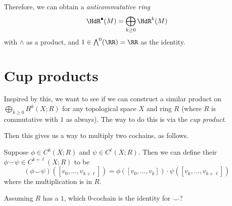 Therefore, we can obtain a \emph{anticommutative ring}
\[ \HdR^\bullet(M) = \bigoplus_{k \ge 0} \HdR^k(M) \]
with $\wedge$ as a product, and $1 \in \bigwedge^0(\RR) = \RR$ as the identity.

\section{Cup products}
Inspired by this, we want to see if we can construct a similar product
on $\bigoplus_{k \ge 0} H^k(X; R)$ for any topological space $X$ and ring $R$
(where $R$ is commutative with $1$ as always).
The way to do this is via the \emph{cup product}.

Then this gives us a way to multiply two cochains, as follows.
\begin{definition}
	Suppose $\phi \in C^k(X;R)$ and $\psi \in C^\ell(X;R)$.
	Then we can define their 
	$\phi\smile\psi \in C^{k+\ell}(X;R)$ to be
	\[
		(\phi\smile\psi)([v_0, \dots, v_{k+\ell}])
		=
		\phi\left( [v_0, \dots, v_k] \right)
		\cdot
		\psi\left( [v_k, \dots, v_{k+\ell}] \right)
	\]
	where the multiplication is in $R$.
\end{definition}

\begin{ques}
	Assuming $R$ has a $1$, which $0$-cochain is the identity for $\smile$?
\end{ques}

